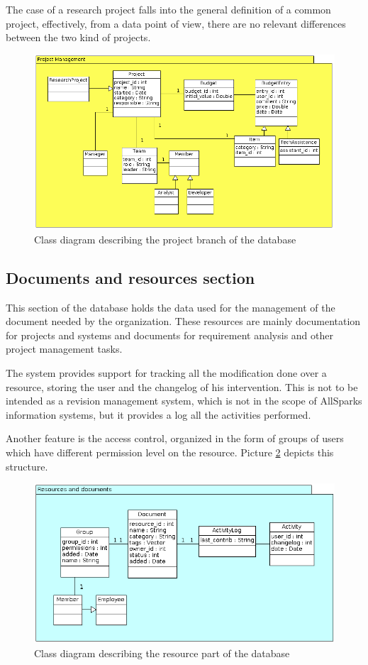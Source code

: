 The case of a research project falls into the general definition of a
common project, effectively, from a data point of view, there are no
relevant differences between the two kind of projects.

\begin{figure}[H]
\centering
\includegraphics[scale=0.50]{assign3/argo/imgs/project.png}
\caption{Class diagram describing the project branch of the database}
\label{3img:classprj}
\end{figure}

\subsection{Documents and resources section}
This section of the database holds the data used for the management of the
document needed by the organization. These resources are mainly
documentation for projects and systems and documents for requirement
analysis and other project management tasks.

The system provides support for tracking all the modification done over a
resource, storing the user and the changelog of his intervention. This is
not to be intended as a revision management system, which is not in the
scope of AllSparks information systems, but it provides a log all the
activities performed.

Another feature is the access control, organized in the form of groups of
users which have different permission level on the resource.
Picture \ref{3img:classres} depicts this structure.

\begin{figure}[H]
\centering
\includegraphics[scale=0.60]{assign3/argo/imgs/resources.png}
\caption{Class diagram describing the resource part of the database}
\label{3img:classres}
\end{figure}

